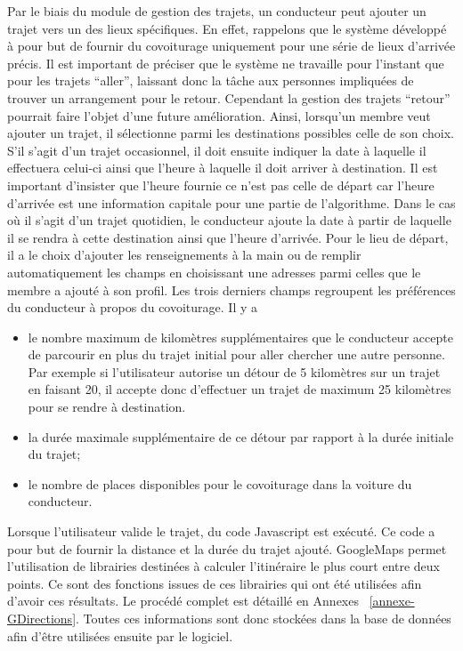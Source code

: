 \documentclass[12pt, a4paper, oneside]{article}
\begin{document}
{{    \indent Par le biais du module de gestion des trajets, un conducteur peut ajouter un trajet vers un des lieux spécifiques. En effet, rappelons que le système développé à pour but de fournir du covoiturage uniquement pour une série de lieux d'arrivée précis. Il est important de préciser que le système ne travaille pour l'instant que pour les trajets ``aller'', laissant donc la tâche aux personnes impliquées de trouver un arrangement pour le retour. Cependant la gestion des trajets ``retour'' pourrait faire l'objet d'une future amélioration. Ainsi, lorsqu'un membre veut ajouter un trajet, il sélectionne parmi les destinations possibles celle de son choix. S'il s'agit d'un trajet occasionnel, il doit ensuite indiquer la date à laquelle il effectuera celui-ci ainsi que l'heure à laquelle il doit arriver à destination. Il est important d'insister que l'heure fournie ce n'est pas celle de départ car l'heure d'arrivée est une information capitale pour une partie de l'algorithme. Dans le cas où il s'agit d'un trajet quotidien, le conducteur ajoute la date à partir de laquelle il se rendra à cette destination ainsi que l'heure d'arrivée. Pour le lieu de départ, il a le choix d'ajouter les renseignements à la main ou de remplir automatiquement les champs en choisissant une adresses parmi celles que le membre a ajouté à son profil. Les trois derniers champs regroupent les préférences du conducteur à propos du covoiturage. Il y a \\
    \begin{itemize}
        \item le nombre maximum de kilomètres supplémentaires que le conducteur accepte de parcourir en plus du trajet initial pour aller chercher une autre personne. Par exemple si l'utilisateur autorise un détour de 5 kilomètres sur un trajet en faisant 20, il accepte donc d'effectuer un trajet de maximum 25 kilomètres pour se rendre à destination.\\
        \item la durée maximale supplémentaire de ce détour par rapport à la durée initiale du trajet;\\
        \item le nombre de places disponibles pour le covoiturage dans la voiture du conducteur.\\
    \end{itemize}
    Lorsque l'utilisateur valide le trajet, du code Javascript est exécuté. Ce code a pour but de fournir la distance et la durée du trajet ajouté. GoogleMaps permet l'utilisation de librairies destinées à calculer l'itinéraire le plus court entre deux points. Ce sont des fonctions issues de ces librairies qui ont été utilisées afin d'avoir ces résultats. Le procédé complet est détaillé en Annexes ~\ref{annexe-GDirections}. Toutes ces informations sont donc stockées dans la base de données afin d'être utilisées ensuite par le logiciel.\\\\
}}
\end{document}
